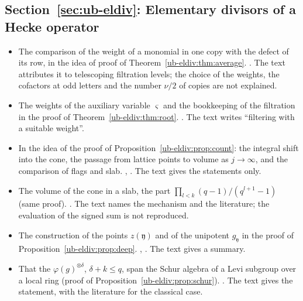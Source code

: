 \subsection*{Section~\ref{sec:ub-eldiv}: Elementary divisors of a Hecke operator}
\begin{itemize}[leftmargin=2em,itemsep=1pt]
\item The comparison of the weight of a monomial in one copy with the defect of its row, in the idea
  of proof of Theorem~\ref{ub-eldiv:thm:average}. .
  The text attributes it to telescoping filtration levels; the choice of the weights, the cofactors
  at odd letters and the number $\nu/2$ of copies are not explained.
\item The weights of the auxiliary variable $\varsigma$ and the bookkeeping of the filtration in the
  proof of Theorem~\ref{ub-eldiv:thm:root}.
  .
  The text writes ``filtering with a suitable weight''.
\item In the idea of the proof of Proposition~\ref{ub-eldiv:prop:count}: the integral shift into the
  cone, the passage from lattice points to volume as $j\to\infty$, and the comparison of flags and
  slab. ,
  . The text gives the statements
  only.
\item The volume of the cone in a slab, the part $\prod_{l<k}(q-1)/(q^{l+1}-1)$ (same proof).
  . The text names the mechanism and the literature;
  the evaluation of the signed sum is not reproduced.
\item The construction of the points $z(\mathfrak y)$ and of the unipotent $g_{\mathfrak y}$ in the
  proof of Proposition~\ref{ub-eldiv:prop:deep}. ,
  . The text gives a summary.
\item That the $\varphi(g)^{\otimes\delta}$, $\delta+k\le q$, span the Schur algebra of a Levi subgroup
  over a local ring (proof of Proposition~\ref{ub-eldiv:prop:schur}).
  . The text gives the statement, with the
  literature for the classical case.
\end{itemize}

